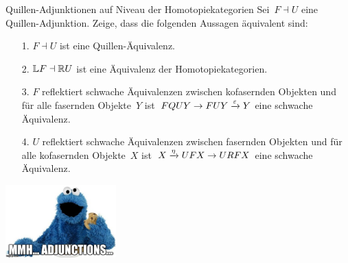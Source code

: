 \documentclass{uebblatt}
\begin{document}
\begin{aufgabe}{Quillen-Adjunktionen auf Niveau der Homotopiekategorien}
Sei~$F \dashv U$ eine Quillen-Adjunktion. Zeige, dass
die folgenden Aussagen äquivalent sind:
\begin{itemize}
\item[1.] $F \dashv U$ ist eine Quillen-Äquivalenz.
\item[2.] $\mathbb{L} F \dashv \mathbb{R} U$ ist eine Äquivalenz der Homotopiekategorien.
\item[3.] $F$ reflektiert schwache Äquivalenzen zwischen kofasernden Objekten und
für alle fasernden Objekte~$Y$ ist~$FQUY \to FUY \xrightarrow{\varepsilon} Y$ eine schwache
Äquivalenz.
\item[4.] $U$ reflektiert schwache Äquivalenzen zwischen fasernden Objekten und
für alle kofasernden Objekte~$X$ ist~$X \xrightarrow{\eta} UFX \to URFX$ eine schwache
Äquivalenz.
\end{itemize}
\end{aufgabe}
\enlargethispage{1.2cm}

\centering
\includegraphics[height=2.8cm]{images/mmh-adjunctions-cookie-monster}
\par
\end{document}
